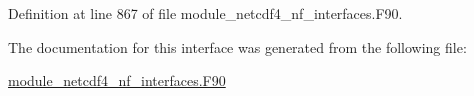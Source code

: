 Definition at line 867 of file module\+\_\+netcdf4\+\_\+nf\+\_\+interfaces.\+F90.



The documentation for this interface was generated from the following file\+:\begin{DoxyCompactItemize}
\item 
\hyperlink{module__netcdf4__nf__interfaces_8F90}{module\+\_\+netcdf4\+\_\+nf\+\_\+interfaces.\+F90}\end{DoxyCompactItemize}
